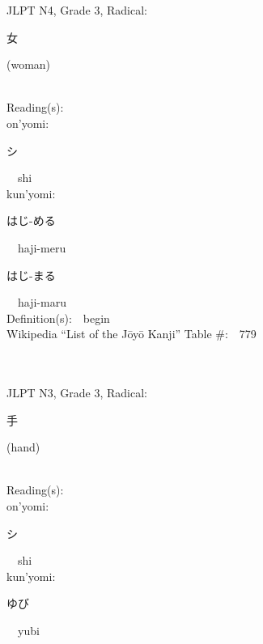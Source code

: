 \begin{multicols}{2}
{JLPT N4, Grade 3, Radical:\ \ {\begin{CJK}{UTF8}{min} 女 \end{CJK}} (woman) } \\
Reading(s):\ \ \\
{\hspace*{1em}}on'yomi:\ \ \\
{\hspace*{2em}}{\begin{CJK}{UTF8}{min} シ \end{CJK}}\ \ shi\ \ \\
{\hspace*{1em}}kun'yomi:\ \ \\
{\hspace*{2em}}{\begin{CJK}{UTF8}{min} はじ-める \end{CJK}}\ \ haji-meru\ \ \\
{\hspace*{2em}}{\begin{CJK}{UTF8}{min} はじ-まる \end{CJK}}\ \ haji-maru\ \ \\
Definition(s):\ \ begin \\
Wikipedia ``List of the J\=oy\=o Kanji'' Table \#:\ \ 779 \\
\ \ \\
{\fontsize{34pt}{40pt}  }\ \ \\  %
{JLPT N3, Grade 3, Radical:\ \ {\begin{CJK}{UTF8}{min} 手 \end{CJK}} (hand) } \\
Reading(s):\ \ \\
{\hspace*{1em}}on'yomi:\ \ \\
{\hspace*{2em}}{\begin{CJK}{UTF8}{min} シ \end{CJK}}\ \ shi\ \ \\
{\hspace*{1em}}kun'yomi:\ \ \\
{\hspace*{2em}}{\begin{CJK}{UTF8}{min} ゆび \end{CJK}}\ \ yubi\ \ \\

\end{multicols}
